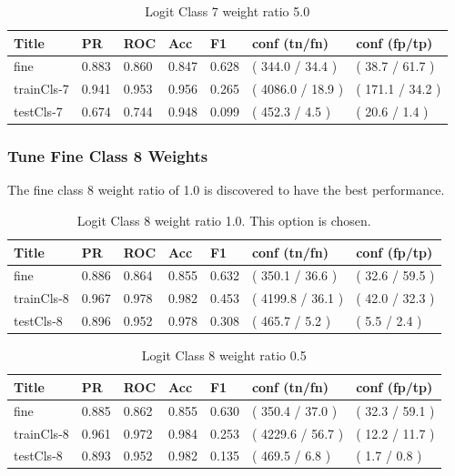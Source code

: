 \documentclass[ms]{nuthesis}
\begin{document}
\FloatBarrier
\begin{table}[H]
\centering
\caption{Logit Class 7 weight ratio 5.0}
\label{tab:LogRegCls7-Wt5}
\begin{tabular}{|l||l||l||l||l||l||l|}\toprule
Title & PR & ROC & Acc & F1 & conf (tn/fn) & conf (fp/tp) \\ \midrule
fine & 0.883 & 0.860 & 0.847 & 0.628 & ( 344.0 / 34.4 ) & ( 38.7 / 61.7 ) \\
trainCls-7 & 0.941 & 0.953 & 0.956 & 0.265 & ( 4086.0 / 18.9 ) & ( 171.1 / 34.2 ) \\
testCls-7 & 0.674 & 0.744 & 0.948 & 0.099 & ( 452.3 / 4.5 ) & ( 20.6 / 1.4 ) \\ \bottomrule
\end{tabular}
\end{table}
\FloatBarrier

\subsubsection{Tune Fine Class 8 Weights}
\label{sect:endTuneFineClsWeight}
\par The fine class 8 weight ratio of 1.0 is discovered to have the best performance.
\FloatBarrier
\begin{table}[H]
\centering
\caption{Logit Class 8 weight ratio 1.0. This option is chosen.}
\label{tab:LogRegCls8-Wt1}
\begin{tabular}{|l||l||l||l||l||l||l|}\toprule
Title & PR & ROC & Acc & F1 & conf (tn/fn) & conf (fp/tp) \\ \midrule
fine & 0.886 & 0.864 & 0.855 & 0.632 & ( 350.1 / 36.6 ) & ( 32.6 / 59.5 ) \\
trainCls-8 & 0.967 & 0.978 & 0.982 & 0.453 & ( 4199.8 / 36.1 ) & ( 42.0 / 32.3 ) \\
testCls-8 & 0.896 & 0.952 & 0.978 & 0.308 & ( 465.7 / 5.2 ) & ( 5.5 / 2.4 ) \\ \bottomrule
\end{tabular}
\end{table}
\FloatBarrier


\FloatBarrier
\begin{table}[H]
\centering
\caption{Logit Class 8 weight ratio 0.5}
\label{tab:LogRegCls8-Wtp5}
\begin{tabular}{|l||l||l||l||l||l||l|}\toprule
Title & PR & ROC & Acc & F1 & conf (tn/fn) & conf (fp/tp) \\ \midrule
fine & 0.885 & 0.862 & 0.855 & 0.630 & ( 350.4 / 37.0 ) & ( 32.3 / 59.1 ) \\
trainCls-8 & 0.961 & 0.972 & 0.984 & 0.253 & ( 4229.6 / 56.7 ) & ( 12.2 / 11.7 ) \\
testCls-8 & 0.893 & 0.952 & 0.982 & 0.135 & ( 469.5 / 6.8 ) & ( 1.7 / 0.8 ) \\ \bottomrule
\end{tabular}
\end{table}
\FloatBarrier
\end{document}
